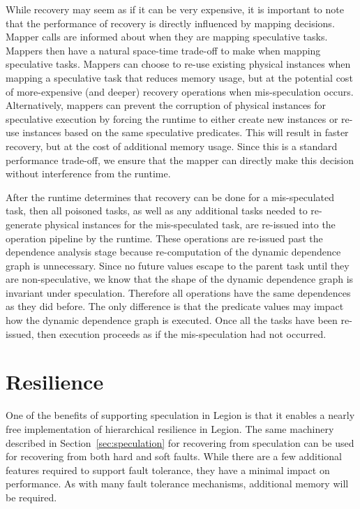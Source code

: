 While recovery may seem as if it can be very expensive, it
is important to note that the performance of recovery is
directly influenced by mapping decisions. Mapper calls are
informed about when they are mapping speculative tasks. 
Mappers then have a natural space-time trade-off to make
when mapping speculative tasks. Mappers can choose to 
re-use existing physical instances when mapping a speculative
task that reduces memory usage, but at the potential cost
of more-expensive (and deeper) recovery operations when
mis-speculation occurs. Alternatively, mappers can prevent
the corruption of physical instances for speculative execution
by forcing the runtime to either create new instances or
re-use instances based on the same speculative predicates.
This will result in faster recovery, but at the cost of
additional memory usage. Since this is a standard performance
trade-off, we ensure that the mapper can directly make
this decision without interference from the runtime.

After the runtime determines that recovery can be done
for a mis-speculated task, then all poisoned tasks, as well
as any additional tasks needed to re-generate physical
instances for the mis-speculated task, are re-issued 
into the operation pipeline by the runtime. These operations
are re-issued past the dependence analysis stage because
re-computation of the dynamic dependence graph is unnecessary.
Since no future values escape to the parent task until they
are non-speculative, we know that the shape of the dynamic
dependence graph is invariant under speculation. Therefore
all operations have the same dependences as they did before.
The only difference is that the predicate values may
impact how the dynamic dependence graph is executed. Once
all the tasks have been re-issued, then execution proceeds
as if the mis-speculation had not occurred.


\section{Resilience}
\label{sec:resilience}
One of the benefits of supporting speculation in Legion is
that it enables a nearly free implementation of hierarchical
resilience in Legion. The same machinery described in 
Section~\ref{sec:speculation} for recovering from speculation
can be used for recovering from both hard and soft faults.
While there are a few additional features required
to support fault tolerance, they have a minimal impact
on performance. As with many fault
tolerance mechanisms, additional memory will be required.

